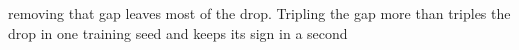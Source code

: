 removing that gap leaves most of the drop. Tripling the gap more than triples the drop in one training seed and keeps its sign in a second
